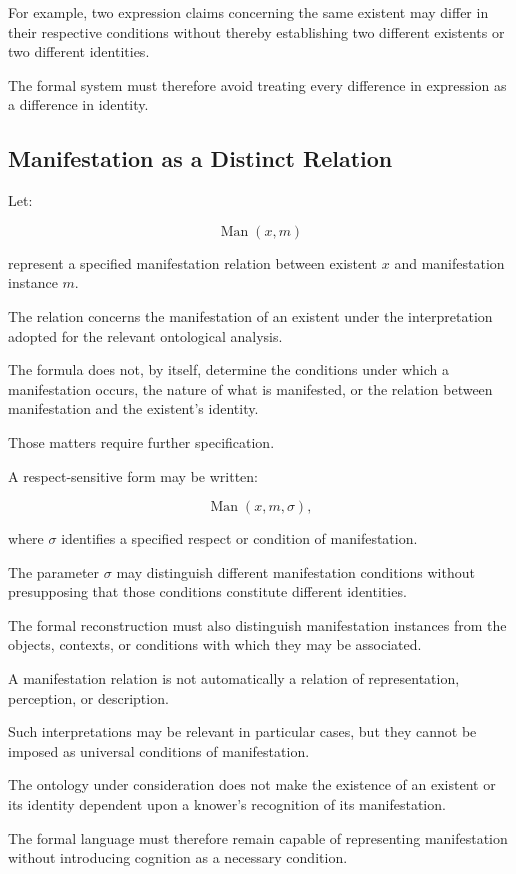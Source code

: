For example, two expression claims
concerning the same existent may
differ in their respective conditions
without thereby establishing two
different existents or two different
identities.

The formal system must therefore
avoid treating every difference in
expression as a difference in identity.

\subsection{Manifestation as a Distinct Relation}

Let:

\[
    \operatorname{Man}(x,m)
\]

represent a specified manifestation
relation between existent \(x\) and
manifestation instance \(m\).

The relation concerns the manifestation
of an existent under the interpretation
adopted for the relevant ontological
analysis.

The formula does not, by itself,
determine the conditions under which
a manifestation occurs, the nature
of what is manifested, or the relation
between manifestation and the
existent's identity.

Those matters require further
specification.

A respect-sensitive form may be written:

\[
    \operatorname{Man}(x,m,\sigma),
\]

where \(\sigma\) identifies a specified
respect or condition of manifestation.

The parameter \(\sigma\) may distinguish
different manifestation conditions
without presupposing that those
conditions constitute different
identities.

The formal reconstruction must
also distinguish manifestation
instances from the objects, contexts,
or conditions with which they may
be associated.

A manifestation relation is not
automatically a relation of
representation, perception, or
description.

Such interpretations may be relevant
in particular cases, but they cannot
be imposed as universal conditions
of manifestation.

The ontology under consideration
does not make the existence of an
existent or its identity dependent
upon a knower's recognition of
its manifestation.

The formal language must therefore
remain capable of representing
manifestation without introducing
cognition as a necessary condition.

